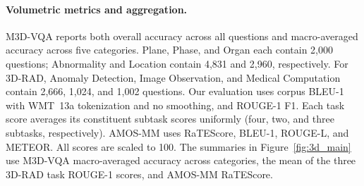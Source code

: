 \paragraph{Volumetric metrics and aggregation.}
M3D-VQA reports both overall accuracy across all questions and macro-averaged accuracy across five categories. Plane, Phase, and Organ each contain 2,000 questions; Abnormality and Location contain 4,831 and 2,960, respectively. For 3D-RAD, Anomaly Detection, Image Observation, and Medical Computation contain 2,666, 1,024, and 1,002 questions. Our evaluation uses corpus BLEU-1 with WMT~13a tokenization and no smoothing, and ROUGE-1 F1. Each task score averages its constituent subtask scores uniformly (four, two, and three subtasks, respectively). AMOS-MM uses RaTEScore, BLEU-1, ROUGE-L, and METEOR. All scores are scaled to 100. The summaries in Figure~\ref{fig:3d_main} use M3D-VQA macro-averaged accuracy across categories, the mean of the three 3D-RAD task ROUGE-1 scores, and AMOS-MM RaTEScore.
